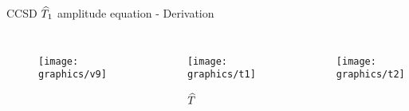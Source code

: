 \begin{frame}{CCSD $\widehat{T}_1$ amplitude equation - Derivation }
\begin{columns}[t]
\begin{figure}
        \parbox{0.20\textwidth}{
            \centering
            \texttt{[image: graphics/v9]}} 
    \end{figure}
    \begin{figure}
        \caption{$\widehat{T}$}
        \centering
        \parbox[height=3cm]{0.60\textwidth}{
            \centering
            \texttt{[image: graphics/t1]}} 
    \end{figure}
    \begin{figure}
        \parbox[height=3cm]{0.60\textwidth}{
            \centering
            \texttt{[image: graphics/t2]}} 
    \end{figure}
\end{columns}


\end{frame}

    
